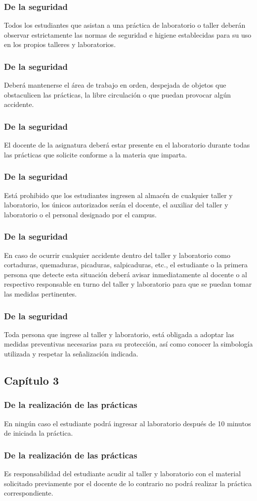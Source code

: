 \documentclass[14pt]{beamer}
\begin{document}
\begin{frame}
\frametitle{De la seguridad}
 Todos los estudiantes que asistan a una práctica de laboratorio o taller deberán observar estrictamente las normas de seguridad e higiene establecidas para su uso en los propios talleres y
laboratorios.
\end{frame}
\begin{frame}
\frametitle{De la seguridad}
 Deberá mantenerse el área de trabajo en orden, despejada de objetos que  obstaculicen las prácticas, la libre circulación o que puedan provocar algún accidente.
\end{frame}
\begin{frame}
\frametitle{De la seguridad}
 El docente de la asignatura deberá estar presente en el laboratorio durante todas las prácticas que solicite conforme a la materia que imparta.
\end{frame}
\begin{frame}
\frametitle{De la seguridad}
 Está prohibido que los estudiantes ingresen al almacén de cualquier taller y laboratorio, los únicos autorizados serán el docente, el auxiliar del taller y laboratorio o el personal designado por el campus.
\end{frame}
\begin{frame}
\frametitle{De la seguridad}
 En caso de ocurrir cualquier accidente dentro del taller y laboratorio como cortaduras, quemaduras, picaduras, salpicaduras, etc., \pause el estudiante o la primera persona que detecte esta situación deberá avisar inmediatamente al docente o al respectivo responsable en turno del taller y laboratorio para que se puedan tomar las medidas pertinentes.
\end{frame}
\begin{frame}
\frametitle{De la seguridad}
 Toda persona que ingrese al taller y laboratorio, está obligada a adoptar las medidas preventivas necesarias para su protección, \pause así como conocer la simbología utilizada y respetar la señalización indicada.
\end{frame}

\subsection{Capítulo 3}

\begin{frame}
\frametitle{De la realización de las prácticas}
 En ningún caso el estudiante podrá ingresar al laboratorio después de 10 minutos de iniciada la práctica.
\end{frame}
\begin{frame}
\frametitle{De la realización de las prácticas}
 Es responsabilidad del estudiante acudir al taller y laboratorio con el material solicitado previamente por el docente de lo contrario no podrá realizar la práctica correspondiente.
\end{frame}
\end{document}
